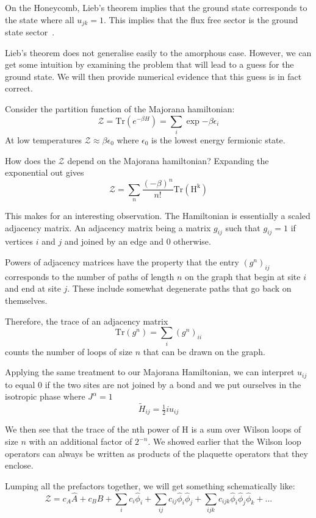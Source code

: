 On the Honeycomb, Lieb's theorem implies that the ground state corresponds to the state where all \(u_{jk} = 1\). This implies that the flux free sector is the ground state sector~\autocite{lieb_flux_1994}.

Lieb's theorem does not generalise easily to the amorphous case. However, we can get some intuition by examining the problem that will lead to a guess for the ground state. We will then provide numerical evidence that this guess is in fact correct.

Consider the partition function of the Majorana hamiltonian: \[ \mathcal{Z} = \mathrm{Tr}\left( e^{-\beta H}\right) = \sum_i \exp{-\beta \epsilon_i}\] At low temperatures \(\mathcal{Z} \approx \beta \epsilon_0\) where \(\epsilon_0\) is the lowest energy fermionic state.

How does the \(\mathcal{Z}\) depend on the Majorana hamiltonian? Expanding the exponential out gives \[ \mathcal{Z} = \sum_n \frac{(-\beta)^n}{n!} \mathrm{Tr(H^k)} \]

This makes for an interesting observation. The Hamiltonian is essentially a scaled adjacency matrix. An adjacency matrix being a matrix \(g_{ij}\) such that \(g_{ij} = 1\) if vertices \(i\) and \(j\) and joined by an edge and 0 otherwise.

Powers of adjacency matrices have the property that the entry \((g^n)_{ij}\) corresponds to the number of paths of length \(n\) on the graph that begin at site \(i\) and end at site \(j\). These include somewhat degenerate paths that go back on themselves.

Therefore, the trace of an adjacency matrix \[\mathrm{Tr}(g^n) = \sum_i (g^n)_{ii}\] counts the number of loops of size \(n\) that can be drawn on the graph.

Applying the same treatment to our Majorana Hamiltonian, we can interpret \(u_{ij}\) to equal 0 if the two sites are not joined by a bond and we put ourselves in the isotropic phase where \(J^\alpha = 1\) \[ \tilde{H}_{ij} =  \tfrac{1}{2} i u_{ij}\]

We then see that the trace of the nth power of H is a sum over Wilson loops of size \(n\) with an additional factor of \(2^{-n}\). We showed earlier that the Wilson loop operators can always be written as products of the plaquette operators that they enclose.

Lumping all the prefactors together, we will get something schematically like: \[ \mathcal{Z} = c_A \hat{A} + c_B \hat{B} + \sum_i c_i \hat{\phi}_i + \sum_{ij} c_{ij}  \hat{\phi}_i \hat{\phi}_j + \sum_{ijk} c_{ijk}  \hat{\phi}_i \hat{\phi}_j \hat{\phi}_k + ...\]

